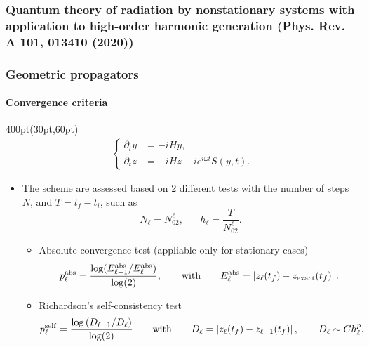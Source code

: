 \begin{frame}
\frametitle{Quantum theory of radiation by nonstationary systems 
	with application to high-order harmonic generation
        (Phys. Rev. A 101, 013410 (2020))}
\frametitle{Geometric propagators}
        \framesubtitle{Convergence criteria}

\footnotesize
\begin{textblock*}{400pt}(30pt,60pt)
\begin{align}
\begin{cases}
	\partial_t y  & = -iH y,                          \\
	\partial_t z  & = -iH z -i e^{i\omega t}S(y,t).
\end{cases}
\end{align}
\begin{itemize}
 \item The scheme are assessed based on 2 different tests
	 with the number of steps $N$, and $T=t_f - t_i$, such as
		\begin{equation}
N_\ell = N_02^\ell, \hspace{20pt} h_\ell = \frac{T}{N_02^\ell}.
		\end{equation}

	 \begin{itemize}
          \footnotesize	
  \item[$\bullet$] Absolute convergence test (appliable only for stationary cases)
		\begin{align}
		p_\ell^{\rm abs} = 
  \frac{\log(E_{\ell-1}^{\rm abs}/E_\ell^{\rm abs})}
			  {\log(2)}, 
			  \hspace{20pt}\mbox{with}  \hspace{20pt}
			  E_\ell^{\rm abs}  = 
			  \left| z_{\ell}(t_f) - z_{\rm exact}(t_f)\right|.
		   \end{align}
	   \item[$\bullet$] Richardson's self-consistency test
		\begin{align}
		p_\ell^{\rm self}  = 
			  \frac{\log\left({D_{\ell-1}/D_\ell}\right)}{\log(2)}
			  \hspace{20pt}\mbox{with} \hspace{20pt}
			 D_\ell  = 
			  \left| z_{\ell}(t_f) - z_{\ell-1}(t_f)\right|,
			  \hspace{20pt}
			  D_\ell \sim C h_\ell^p.
		   \end{align}
	
	 \end{itemize}
\end{itemize}
\end{textblock*}



\end{frame}
